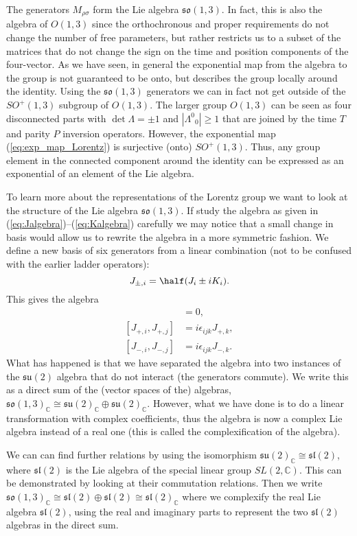 \documentclass[notes.tex]{subfiles}
\begin{document}
The generators $M_{\rho \sigma}$ form the Lie algebra $\mathfrak{so}(1,3)$. In fact, this is also the algebra of $O(1,3)$ since the orthochronous and proper requirements do not change the number of free parameters, but rather restricts us to a subset of the matrices that do not change the sign on the time and position components of the four-vector. 
As we have seen, in general the exponential map from the algebra to the group is not guaranteed to be onto, but describes the group locally around the identity. Using the $\mathfrak{so}(1,3)$ generators we can in fact not get outside of the $SO^+(1,3)$ subgroup of $O(1,3)$. The larger group $O(1,3)$ can be seen as four disconnected parts with $\det\Lambda=\pm1$ and $|\Lambda^0{}_0| \geq1$ that are joined by the time $T$ and parity $P$ inversion operators.
However, the exponential map (\ref{eq:exp_map_Lorentz}) is surjective (onto) $SO^+(1,3)$. Thus, any group element in the connected component around the identity can be expressed as an exponential of an element of the Lie algebra. 

To learn more about the representations of the Lorentz group we want to look at the structure of the Lie algebra $\mathfrak{so}(1,3)$. If study  the algebra as given in  (\ref{eq:Jalgebra})--(\ref{eq:Kalgebra}) carefully we may notice that a small change  in basis would allow us to rewrite the algebra in a more symmetric fashion. We define a new basis of six generators from a linear combination (not to be confused with the earlier ladder operators):
\begin{equation*}
J_{\pm,i}=\half(J_i\pm iK_i).
\end{equation*}
This gives the algebra
\begin{align*}
[J_{+,i},J_{-,j}] &= 0, \\
[J_{+,i},J_{+,j}] &= i \epsilon_{ijk}J_{+,k}, \\
[J_{-,i},J_{-,j}] &= i \epsilon_{ijk}J_{-,k}.
\end{align*}
What has happened is that we have separated the algebra into two instances of the $\mathfrak{su}(2)$ algebra that do not interact (the generators commute). We write this as a direct sum of the (vector spaces of the) algebras, $\mathfrak{so}(1,3)_{\mathbb C}\cong  \mathfrak{su}(2)_{\mathbb C}\oplus \mathfrak{su}(2)_{\mathbb C}$. However, what we have done is to do a linear transformation with complex coefficients, thus the algebra is now a complex Lie algebra instead of a real one (this is called the complexification of the algebra). 

We can can find further relations by using the isomorphism $\mathfrak{su}(2)_{\mathbb C}\cong \mathfrak{sl}(2)$, where $\mathfrak{sl}(2)$ is the Lie algebra of the special linear group $SL(2,\mathbb C)$. This can be demonstrated by looking at their commutation relations. Then we write
$\mathfrak{so}(1,3)_{\mathbb C}\cong \mathfrak{sl}(2)\oplus\mathfrak{sl}(2)\cong\mathfrak{sl}(2)_{\mathbb C}$ where we complexify the real Lie algebra $\mathfrak{sl}(2)$, using the real and imaginary parts to represent the two $\mathfrak{sl}(2)$ algebras in the direct sum.
\end{document}
